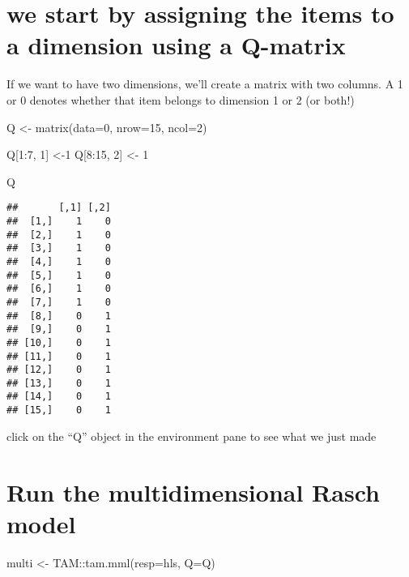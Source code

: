 \documentclass[
]{book}
\newenvironment{Shaded}{\begin{snugshade}}{\end{snugshade}}
\newcommand{\AttributeTok}[1]{\textcolor[rgb]{0.77,0.63,0.00}{#1}}
\newcommand{\DecValTok}[1]{\textcolor[rgb]{0.00,0.00,0.81}{#1}}
\newcommand{\FunctionTok}[1]{\textcolor[rgb]{0.00,0.00,0.00}{#1}}
\newcommand{\NormalTok}[1]{#1}
\newcommand{\OtherTok}[1]{\textcolor[rgb]{0.56,0.35,0.01}{#1}}
\newcommand{\SpecialCharTok}[1]{\textcolor[rgb]{0.00,0.00,0.00}{#1}}
\begin{document}
\hypertarget{we-start-by-assigning-the-items-to-a-dimension-using-a-q-matrix}{%
\section{we start by assigning the items to a dimension using a Q-matrix}\label{we-start-by-assigning-the-items-to-a-dimension-using-a-q-matrix}}

If we want to have two dimensions, we'll create a matrix with two columns. A 1 or 0 denotes whether that item belongs to dimension 1 or 2 (or both!)

\begin{Shaded}
\begin{Highlighting}[]
\NormalTok{Q }\OtherTok{\textless{}{-}} \FunctionTok{matrix}\NormalTok{(}\AttributeTok{data=}\DecValTok{0}\NormalTok{, }\AttributeTok{nrow=}\DecValTok{15}\NormalTok{, }\AttributeTok{ncol=}\DecValTok{2}\NormalTok{)}

\NormalTok{Q[}\DecValTok{1}\SpecialCharTok{:}\DecValTok{7}\NormalTok{, }\DecValTok{1}\NormalTok{] }\OtherTok{\textless{}{-}}\DecValTok{1}
\NormalTok{Q[}\DecValTok{8}\SpecialCharTok{:}\DecValTok{15}\NormalTok{, }\DecValTok{2}\NormalTok{] }\OtherTok{\textless{}{-}} \DecValTok{1}




\NormalTok{Q}
\end{Highlighting}
\end{Shaded}

\begin{verbatim}
##       [,1] [,2]
##  [1,]    1    0
##  [2,]    1    0
##  [3,]    1    0
##  [4,]    1    0
##  [5,]    1    0
##  [6,]    1    0
##  [7,]    1    0
##  [8,]    0    1
##  [9,]    0    1
## [10,]    0    1
## [11,]    0    1
## [12,]    0    1
## [13,]    0    1
## [14,]    0    1
## [15,]    0    1
\end{verbatim}

click on the ``Q'' object in the environment pane to see what we just made

\hypertarget{run-the-multidimensional-rasch-model}{%
\section{Run the multidimensional Rasch model}\label{run-the-multidimensional-rasch-model}}

\begin{Shaded}
\begin{Highlighting}[]
\NormalTok{multi }\OtherTok{\textless{}{-}}\NormalTok{ TAM}\SpecialCharTok{::}\FunctionTok{tam.mml}\NormalTok{(}\AttributeTok{resp=}\NormalTok{hls, }\AttributeTok{Q=}\NormalTok{Q)}
\end{Highlighting}
\end{Shaded}
\end{document}
